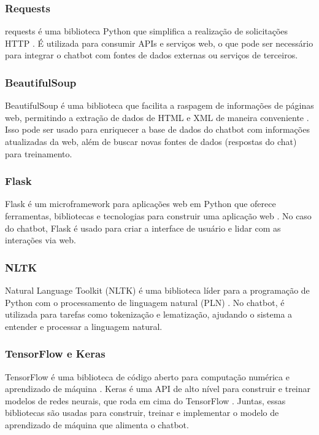 \documentclass[conference]{IEEEtran}
\begin{document}
\subsubsection{Requests}
requests é uma biblioteca Python que simplifica a realização de solicitações HTTP \cite{Reitz2016}. 
É utilizada para consumir APIs e serviços web, o que pode ser necessário para integrar 
o chatbot com fontes de dados externas ou serviços de terceiros.

\subsubsection{BeautifulSoup}
BeautifulSoup é uma biblioteca que facilita a raspagem de informações de páginas web, 
permitindo a extração de dados de HTML e XML de maneira conveniente \cite{Richardson2007}. 
Isso pode ser usado para enriquecer a base de dados do chatbot com informações atualizadas da web,
além de buscar novas fontes de dados (respostas do chat) para treinamento.

\subsubsection{Flask}
Flask é um microframework para aplicações web em Python que oferece ferramentas, 
bibliotecas e tecnologias para construir uma aplicação web \cite{Grinberg2018}. 
No caso do chatbot, Flask é usado para criar a interface de usuário e lidar com as interações via web.

\subsubsection{NLTK}
Natural Language Toolkit (NLTK) é uma biblioteca líder para a programação de Python 
com o processamento de linguagem natural (PLN) \cite{Bird2009}.
No chatbot, é utilizada para tarefas como tokenização e lematização, 
ajudando o sistema a entender e processar a linguagem natural.

\subsubsection{TensorFlow e Keras}
TensorFlow é uma biblioteca de código aberto para computação numérica e aprendizado de máquina \cite{Abadi2016}. 
Keras é uma API de alto nível para construir e treinar modelos de redes neurais, 
que roda em cima do TensorFlow \cite{Chollet2015}. 
Juntas, essas bibliotecas são usadas para construir, treinar e implementar 
o modelo de aprendizado de máquina que alimenta o chatbot.
\end{document}
